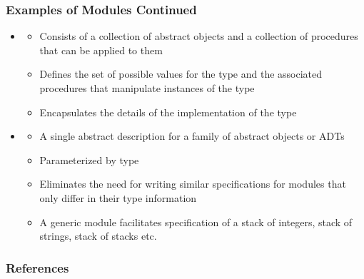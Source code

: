 \documentclass[t, 12pt, numbers, fleqn, handout]{beamer}
\begin{document}

\begin{frame}
\frametitle{Examples of Modules Continued}

\begin{itemize}

\item {}
\begin{itemize}
\item Consists of a collection of abstract objects and a collection of
  procedures that can be applied to them
\item Defines the set of possible values for the type and the associated
  procedures that manipulate instances of the type
\item Encapsulates the details of the implementation of the type
\end{itemize}
\item {}
\begin{itemize}
\item A single abstract description for a family of abstract objects or ADTs
\item Parameterized by type
\item Eliminates the need for writing similar specifications for modules that
  only differ in their type information
\item A generic module facilitates specification of a stack of integers, stack
  of strings, stack of stacks etc.
\end{itemize}

\end{itemize}

\end{frame}


\begin{frame}[allowframebreaks]
\frametitle{References}



\end{frame}

\end{document}
